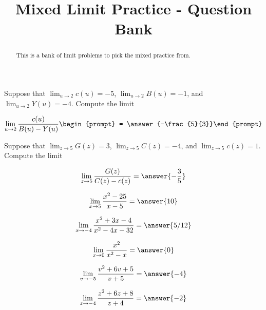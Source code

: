 \documentclass[handout]{ximera}
\title{Mixed Limit Practice - Question Bank}
\begin{document}
\begin{abstract}
This is a bank of limit problems to pick the mixed practice from. 
\end{abstract}
\maketitle

\begin{exercise}
Suppose that $\displaystyle\lim_{u\to2}c(u)=-5$, $\displaystyle\lim_{u\to2}B(u)=-1$, and $\displaystyle\lim_{u\to2}Y(u)=-4$. Compute the limit

\[
\lim_{u\to 2 } \frac{c(u)}{B(u)-Y(u)}\begin{prompt} = \answer{-\frac{5}{3}}\end{prompt}
\]
\end{exercise}

\begin{exercise}
Suppose that $\lim_{z\to5}G(z)=3$, $\lim_{z\to5}C(z)=-4$, and $\lim_{z\to5}c(z)=1$. Compute the limit

\[
\lim_{z\to 5 } \frac{G(z)}{C(z)-c(z)} = \answer{-\frac{3}{5}}
\]
\end{exercise}

\begin{exercise}
\[\lim_{x \to 5} \frac{x^2-25}{x-5} = \answer{10}\]
\end{exercise}


\begin{exercise}
\[\lim_{x \to -4} \frac{x^2+3x-4}{x^2-4x-32} = \answer{5/12}\]

\end{exercise}

\begin{exercise}
\[\lim_{x \to 0} \frac{x^2}{x^2-x} = \answer{0}\]

\end{exercise}

\begin{exercise}
\[
\lim_{v\to -5 } \frac{v^2+6 v+5}{v+5} = \answer{-4}
\]
\end{exercise}

\begin{exercise}
\[
\lim_{z\to -4 } \frac{z^2+6 z+8}{z+4} = \answer{-2}
\]
\end{exercise}
\end{document}
